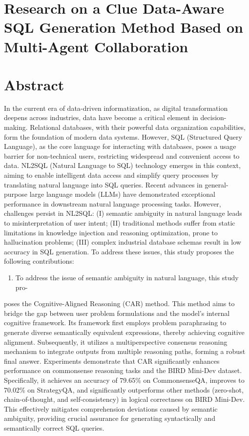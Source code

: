 \documentclass[12pt,a4paper,openright,UTF8]{ctexbook}
\begin{document}
\chapter{Research on a Clue Data-Aware SQL Generation Method Based on Multi-Agent Collaboration}

\chapter*{Abstract}

In the current era of data-driven informatization, as digital transformation deepens across industries, data have become a critical element in decision-making. Relational databases, with their powerful data organization capabilities, form the foundation of modern data systems. However, SQL (Structured Query Language), as the core language for interacting with databases, poses a usage barrier for non-technical users, restricting widespread and convenient access to data. NL2SQL (Natural Language to SQL) technology emerges in this context, aiming to enable intelligent data access and simplify query processes by translating natural language into SQL queries. Recent advances in general-purpose large language models (LLMs) have demonstrated exceptional performance in downstream natural language processing tasks. However, challenges persist in NL2SQL: (I) semantic ambiguity in natural language leads to misinterpretation of user intent; (II) traditional methods suffer from static limitations in knowledge injection and reasoning optimization, prone to hallucination problems; (III) complex industrial database schemas result in low accuracy in SQL generation. To address these issues, this study proposes the following contributions:

\begin{enumerate}[label=(\arabic*)]
\item To address the issue of semantic ambiguity in natural language, this study pro-
\end{enumerate}
poses the Cognitive-Aligned Reasoning (CAR) method. This method aims to bridge the gap between user problem formulations and the model’s internal cognitive framework. Its framework first employs problem paraphrasing to generate diverse semantically equivalent expressions, thereby achieving cognitive alignment. Subsequently, it utilizes a multiperspective consensus reasoning mechanism to integrate outputs from multiple reasoning paths, forming a robust final answer. Experiments demonstrate that CAR significantly enhances performance on commonsense reasoning tasks and the BIRD Mini-Dev dataset. Specifically, it achieves an accuracy of 79.65\% on CommonsenseQA, improves to 70.02\% on StrategyQA, and significantly outperforms other methods (zero-shot, chain-of-thought, and self-consistency) in logical correctness on BIRD Mini-Dev. This effectively mitigates comprehension deviations caused by semantic ambiguity, providing crucial assurance for generating syntactically and semantically correct SQL queries.
\end{document}
